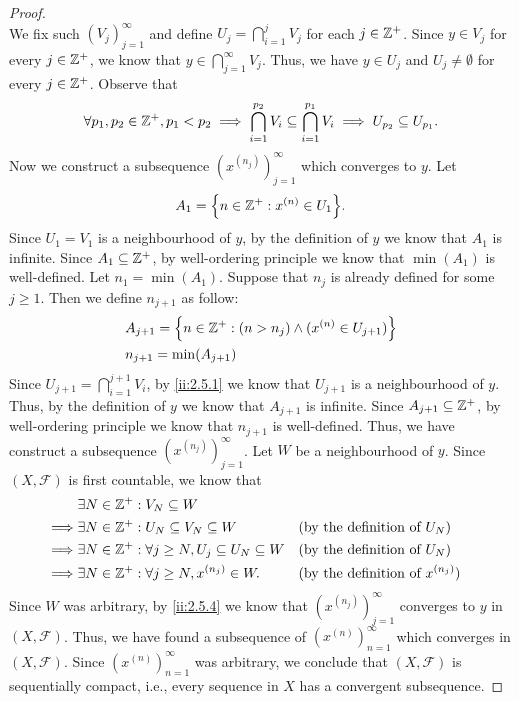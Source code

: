 \begin{proof}
\[  \]
  We fix such \((V_j)_{j = 1}^\infty\) and define \(U_j = \bigcap_{i = 1}^j V_j\) for each \(j \in \mathbb{Z}^+\).
  Since \(y \in V_j\) for every \(j \in \mathbb{Z}^+\), we know that \(y \in \bigcap_{j = 1}^\infty V_j\).
  Thus, we have \(y \in U_j\) and \(U_j \neq \emptyset\) for every \(j \in \mathbb{Z}^+\).
  Observe that
  \[
    \forall p_1, p_2 \in \mathbb{Z}^+, p_1 < p_2 \implies \bigcap_{i = 1}^{p_2} V_i \subseteq \bigcap_{i = 1}^{p_1} V_i \implies U_{p_2} \subseteq U_{p_1}.
  \]
  Now we construct a subsequence \((x^{(n_j)})_{j = 1}^\infty\) which converges to \(y\).
  Let
  \[
    A_1 = \set{n \in \Z^+ : x^{(n)} \in U_1}.
  \]
  Since \(U_1 = V_1\) is a neighbourhood of \(y\), by the definition of \(y\) we know that \(A_1\) is infinite.
  Since \(A_1 \subseteq \mathbb{Z}^+\), by well-ordering principle we know that \(\min(A_1)\) is well-defined.
  Let \(n_1 = \min(A_1)\).
  Suppose that \(n_j\) is already defined for some \(j \geq 1\).
  Then we define \(n_{j + 1}\) as follow:
  \begin{align*}
     & A_{j + 1} = \left\lbrace n \in \mathbb{Z}^+ : (n > n_j) \land (x^{(n)} \in U_{j + 1})\right\rbrace \\
     & n_{j + 1} = \min(A_{j + 1})
  \end{align*}
  Since \(U_{j + 1} = \bigcap_{i = 1}^{j + 1} V_i\), by \cref{ii:2.5.1} we know that \(U_{j + 1}\) is a neighbourhood of \(y\).
  Thus, by the definition of \(y\) we know that \(A_{j + 1}\) is infinite.
  Since \(A_{j + 1} \subseteq \mathbb{Z}^+\), by well-ordering principle we know that \(n_{j + 1}\) is well-defined.
  Thus, we have construct a subsequence \((x^{(n_j)})_{j = 1}^\infty\).
  Let \(W\) be a neighbourhood of \(y\).
  Since \((X, \mathcal{F})\) is first countable, we know that
  \begin{align*}
             & \exists N \in \mathbb{Z}^+ : V_N \subseteq W                                                                                  \\
    \implies & \exists N \in \mathbb{Z}^+ : U_N \subseteq V_N \subseteq W                   &  & \text{(by the definition of \(U_N\))}       \\
    \implies & \exists N \in \mathbb{Z}^+ : \forall j \geq N, U_j \subseteq U_N \subseteq W &  & \text{(by the definition of \(U_N\))}       \\
    \implies & \exists N \in \mathbb{Z}^+ : \forall j \geq N, x^{(n_j)} \in W.              &  & \text{(by the definition of \(x^{(n_j)}\))}
  \end{align*}
  Since \(W\) was arbitrary, by \cref{ii:2.5.4} we know that \((x^{(n_j)})_{j = 1}^\infty\) converges to \(y\) in \((X, \mathcal{F})\).
  Thus, we have found a subsequence of \((x^{(n)})_{n = 1}^\infty\) which converges in \((X, \mathcal{F})\).
  Since \((x^{(n)})_{n = 1}^\infty\) was arbitrary, we conclude that \((X, \mathcal{F})\) is sequentially compact, i.e., every sequence in \(X\) has a convergent subsequence.
\end{proof}

